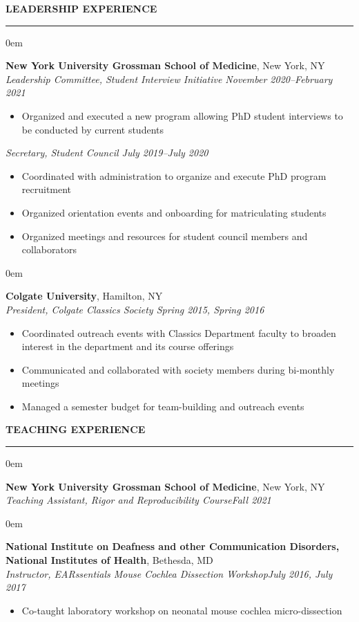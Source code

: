 \documentclass[10pt, letterpaper]{article} %
\newenvironment{CVSection}{
\begin{addmargin}[2em]{0em}
\begin{samepage}}
{\end{samepage}
\end{addmargin}\bigskip}
\newcommand{\CVHeading}[1]{
\MakeUppercase{\bf #1}
\smallskip
\hrule
\medskip
}
\begin{document}
\CVHeading{Leadership Experience}
\begin{CVSection}
\textbf{New York University Grossman School of Medicine}, New York, NY\\
\textsl{Leadership Committee, Student Interview Initiative	\hfill November 2020--February 2021}
\begin{itemize}
\item Organized and executed a new program allowing PhD student interviews to be conducted by current students
\end{itemize}
\medskip
\textsl{Secretary, Student Council	\hfill July 2019--July 2020}
\begin{itemize}
\item Coordinated with administration to organize and execute PhD program recruitment
\item Organized orientation events and onboarding for matriculating students
\item Organized meetings and resources for student council members and collaborators
\end{itemize}
\end{CVSection}
\begin{CVSection}
\textbf{Colgate University}, Hamilton, NY\\
\textsl{President, Colgate Classics Society	\hfill Spring 2015, Spring 2016}
\begin{itemize}
\item Coordinated outreach events with Classics Department faculty to broaden interest in the department and its course offerings
\item Communicated and collaborated with society members during bi-monthly meetings
\item Managed a semester budget for team-building and outreach events
\end{itemize}
\end{CVSection}

\CVHeading{Teaching Experience}
\begin{CVSection}
\textbf{New York University Grossman School of Medicine}, New York, NY\\
\textsl{Teaching Assistant, Rigor and Reproducibility Course\hfill Fall 2021}

\end{CVSection}
\begin{CVSection}
\textbf{National Institute on Deafness and other Communication Disorders,\\ National Institutes of Health}, Bethesda, MD\\
\textsl{Instructor, EARssentials Mouse Cochlea Dissection Workshop\hfill July 2016, July 2017}
\begin{itemize}
\item Co-taught laboratory workshop on neonatal mouse cochlea micro-dissection
\end{itemize}
\end{CVSection}
\end{document}
